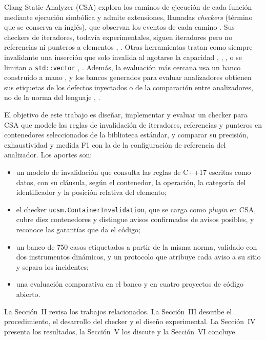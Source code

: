 \documentclass[conference]{IEEEtran}
\newcommand{\code}[1]{\texttt{#1}}
\begin{document}
Clang Static Analyzer (CSA) explora los caminos de ejecución de cada función mediante ejecución simbólica \cite{king76} y admite extensiones, llamadas \textit{checkers} (término que se conserva en inglés), que observan los eventos de cada camino \cite{csadev}. Sus checkers de iteradores, todavía experimentales, siguen iteradores pero no referencias ni punteros a elementos \cite{csadoc}, \cite{balogh18}. Otras herramientas tratan como siempre invalidante una inserción que solo invalida al agotarse la capacidad \cite{saxena26}, \cite{infer}, \cite{cppcheck}, o se limitan a \code{std::vector} \cite{infer}, \cite{liu25}. Además, la evaluación más cercana usa un banco construido a mano \cite{liu25}, y los bancos generados para evaluar analizadores obtienen sus etiquetas de los defectos inyectados o de la comparación entre analizadores, no de la norma del lenguaje \cite{kashyap19}, \cite{klinger19}.

El objetivo de este trabajo es diseñar, implementar y evaluar un checker para CSA que modele las reglas de invalidación de iteradores, referencias y punteros en contenedores seleccionados de la biblioteca estándar, y comparar su precisión, exhaustividad y medida F1 con la de la configuración de referencia del analizador. Los aportes son:
\begin{itemize}
\item un modelo de invalidación que consulta las reglas de C++17 escritas como datos, con su cláusula, según el contenedor, la operación, la categoría del identificador y la posición relativa del elemento;
\item el checker \code{ucsm.ContainerInvalidation}, que se carga como \textit{plugin} en CSA, cubre diez contenedores y distingue avisos confirmados de avisos posibles, y reconoce las garantías que da el código;
\item un banco de 750 casos etiquetados a partir de la misma norma, validado con dos instrumentos dinámicos, y un protocolo que atribuye cada aviso a su sitio y separa los incidentes;
\item una evaluación comparativa en el banco y en cuatro proyectos de código abierto.
\end{itemize}

La Sección~II revisa los trabajos relacionados. La Sección~III describe el procedimiento, el desarrollo del checker y el diseño experimental. La Sección~IV presenta los resultados, la Sección~V los discute y la Sección~VI concluye.
\end{document}
